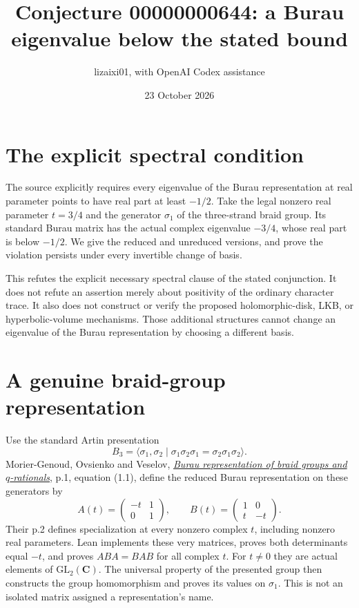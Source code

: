 \documentclass[11pt]{article}
\title{Conjecture 00000000644: a Burau eigenvalue below the stated bound}
\author{lizaixi01, with OpenAI Codex assistance}
\date{23 October 2026}
\begin{document}
\maketitle
\section{The explicit spectral condition}
The source explicitly requires every eigenvalue of the Burau representation
at real parameter points to have real part at least $-1/2$.
Take the legal nonzero real parameter $t=3/4$ and the generator $\sigma_1$
of the three-strand braid group. Its standard Burau matrix has the
actual complex eigenvalue $-3/4$, whose real part is below $-1/2$.
We give the reduced and unreduced versions, and prove the violation
persists under every invertible change of basis.

This refutes the explicit necessary spectral clause of the stated
conjunction. It does not refute an assertion merely about positivity
of the ordinary character trace. It also does not construct or verify
the proposed holomorphic-disk, LKB, or hyperbolic-volume mechanisms.
Those additional structures cannot change an eigenvalue of the Burau
representation by choosing a different basis.

\section{A genuine braid-group representation}
Use the standard Artin presentation
\[
 B_3=\langle\sigma_1,\sigma_2\mid
 \sigma_1\sigma_2\sigma_1=\sigma_2\sigma_1\sigma_2\rangle.
\]
Morier-Genoud, Ovsienko and Veselov,
\href{https://arxiv.org/abs/2309.04240}{\emph{Burau representation of
braid groups and $q$-rationals}}, p.1, equation (1.1), define the reduced
Burau representation on these generators by
\[
 A(t)=\begin{pmatrix}-t&1\\0&1\end{pmatrix},\qquad
 B(t)=\begin{pmatrix}1&0\\t&-t\end{pmatrix}.
\]
Their p.2 defines specialization at every nonzero complex $t$,
including nonzero real parameters. Lean implements these very matrices,
proves both determinants equal $-t$, and proves $ABA=BAB$ for all
complex $t$. For $t\ne0$ they are actual elements of $\mathrm{GL}_2(\mathbf C)$.
The universal property of the presented group then constructs the
group homomorphism and proves its values on $\sigma_1$.
This is not an isolated matrix assigned a representation's name.
\end{document}
